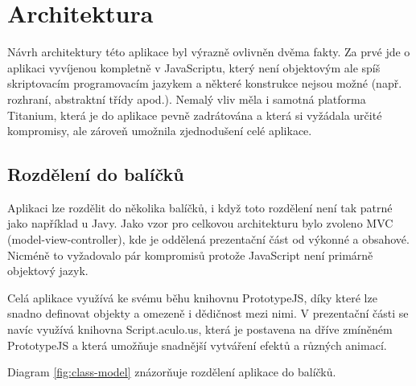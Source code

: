 \chapter{Architektura}

Návrh architektury této aplikace byl výrazně ovlivněn dvěma fakty. Za prvé jde o aplikaci vyvíjenou kompletně v JavaScriptu, který není objektovým ale spíš skriptovacím programovacím jazykem a některé konstrukce nejsou možné (např. rozhraní, abstraktní třídy apod.). Nemalý vliv měla i samotná platforma Titanium, která je do aplikace pevně zadrátována a která si vyžádala určité kompromisy, ale zároveň umožnila zjednodušení celé aplikace.

\section{Rozdělení do balíčků}

Aplikaci lze rozdělit do několika balíčků, i když toto rozdělení není tak patrné jako například u Javy. Jako vzor pro celkovou architekturu bylo zvoleno MVC (model-view-controller), kde je oddělená prezentační část od výkonné a obsahové. Nicméně to vyžadovalo pár kompromisů protože JavaScript není primárně objektový jazyk.

Celá aplikace využívá ke svému běhu knihovnu PrototypeJS\cite{prototypejs}, díky které lze snadno definovat objekty a omezeně i dědičnost mezi nimi. V prezentační části se navíc využívá knihovna Script.aculo.us\cite{scriptaculous}, která je postavena na dříve zmíněném PrototypeJS a která umožňuje snadnější vytváření efektů a různých animací.

Diagram \ref{fig:class-model} znázorňuje rozdělení aplikace do balíčků.

